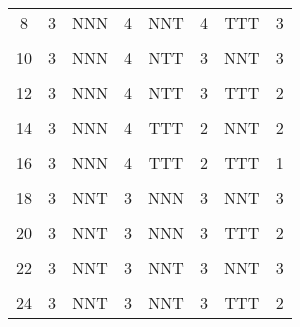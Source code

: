 \begin{table}[H]
{\begin{tabular}[t]{cccccccc}
			8 & 3 & NNN & 4 & NNT & 4 & TTT & 3\\
			\cellcolor{gray!6}{9} & \cellcolor{gray!6}{3} & \cellcolor{gray!6}{NNN} & \cellcolor{gray!6}{4} & \cellcolor{gray!6}{NTT} & \cellcolor{gray!6}{3} & \cellcolor{gray!6}{NNN} & \cellcolor{gray!6}{3}\\
			10 & 3 & NNN & 4 & NTT & 3 & NNT & 3\\
			\cellcolor{gray!6}{11} & \cellcolor{gray!6}{3} & \cellcolor{gray!6}{NNN} & \cellcolor{gray!6}{4} & \cellcolor{gray!6}{NTT} & \cellcolor{gray!6}{3} & \cellcolor{gray!6}{NTT} & \cellcolor{gray!6}{2}\\
			12 & 3 & NNN & 4 & NTT & 3 & TTT & 2\\
			\cellcolor{gray!6}{13} & \cellcolor{gray!6}{3} & \cellcolor{gray!6}{NNN} & \cellcolor{gray!6}{4} & \cellcolor{gray!6}{TTT} & \cellcolor{gray!6}{2} & \cellcolor{gray!6}{NNN} & \cellcolor{gray!6}{3}\\
			14 & 3 & NNN & 4 & TTT & 2 & NNT & 2\\
			\cellcolor{gray!6}{15} & \cellcolor{gray!6}{3} & \cellcolor{gray!6}{NNN} & \cellcolor{gray!6}{4} & \cellcolor{gray!6}{TTT} & \cellcolor{gray!6}{2} & \cellcolor{gray!6}{NTT} & \cellcolor{gray!6}{2}\\
			16 & 3 & NNN & 4 & TTT & 2 & TTT & 1\\
			\cellcolor{gray!6}{17} & \cellcolor{gray!6}{3} & \cellcolor{gray!6}{NNT} & \cellcolor{gray!6}{3} & \cellcolor{gray!6}{NNN} & \cellcolor{gray!6}{3} & \cellcolor{gray!6}{NNN} & \cellcolor{gray!6}{4}\\
			18 & 3 & NNT & 3 & NNN & 3 & NNT & 3\\
			\cellcolor{gray!6}{19} & \cellcolor{gray!6}{3} & \cellcolor{gray!6}{NNT} & \cellcolor{gray!6}{3} & \cellcolor{gray!6}{NNN} & \cellcolor{gray!6}{3} & \cellcolor{gray!6}{NTT} & \cellcolor{gray!6}{3}\\
			20 & 3 & NNT & 3 & NNN & 3 & TTT & 2\\
			\cellcolor{gray!6}{21} & \cellcolor{gray!6}{3} & \cellcolor{gray!6}{NNT} & \cellcolor{gray!6}{3} & \cellcolor{gray!6}{NNT} & \cellcolor{gray!6}{3} & \cellcolor{gray!6}{NNN} & \cellcolor{gray!6}{3}\\
			22 & 3 & NNT & 3 & NNT & 3 & NNT & 3\\
			\cellcolor{gray!6}{23} & \cellcolor{gray!6}{3} & \cellcolor{gray!6}{NNT} & \cellcolor{gray!6}{3} & \cellcolor{gray!6}{NNT} & \cellcolor{gray!6}{3} & \cellcolor{gray!6}{NTT} & \cellcolor{gray!6}{2}\\
			24 & 3 & NNT & 3 & NNT & 3 & TTT & 2\\

\end{tabular}}
\end{table}
